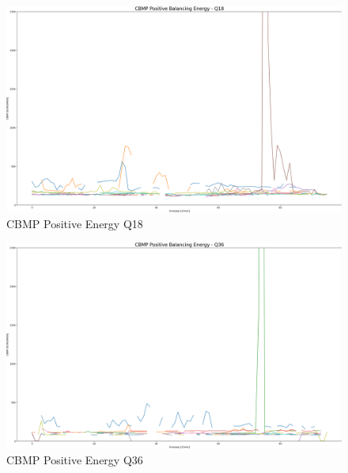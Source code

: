 \begin{figure}
	\includegraphics[width=1\linewidth]{pictures/results/CBMP_PosBal_Q18.png}
	\caption{CBMP Positive Energy Q18}
	\label{fig:CBMP_PosBal_Q18}
\end{figure}
\begin{figure}
	\includegraphics[width=1\linewidth]{pictures/results/CBMP_PosBal_Q36.png}
	\caption{CBMP Positive Energy Q36}
	\label{fig:CBMP_PosBal_Q36}
\end{figure}

